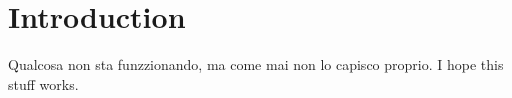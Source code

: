 \documentclass{article}
\begin{document}
    \section{Introduction}
    Qualcosa non sta funzzionando, ma come mai non lo capisco proprio. I hope this stuff works.
\end{document}
